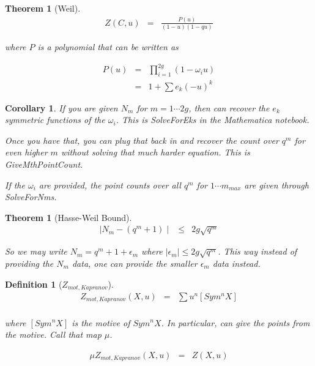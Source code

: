 \documentclass[11pt]{article}
\theoremstyle{change}
\newtheorem{definition}[equation]{Definition}
\newtheorem{thm}[equation]{Theorem}
\newtheorem{theorem}[equation]{Theorem}
\newtheorem{cor}[equation]{Corollary}
\theoremstyle{nonumberplain}
\numberwithin{equation}{section}
\newcommand\abs[1]{ \mid #1 \mid }
\begin{document}
\begin{thm}[Weil]
\begin{eqnarray*}
Z (C,u) &=& \frac{P(u)}{(1-u)(1-q u)}
\end{eqnarray*}

where $P$ is a polynomial that can be written as

\begin{eqnarray*}
P(u) &=& \prod_{i=1}^{2g} (1- \omega_i u)\\
&=& 1 + \sum e_k (-u)^k
\end{eqnarray*}

\end{thm}

\begin{cor}
If you are given $N_m$ for $m=1 \cdots 2g$, then can recover the $e_k$ symmetric functions of the $\omega_i$. This is SolveForEks in the Mathematica notebook.

Once you have that, you can plug that back in and recover the count over $q^m$ for even higher $m$ without solving that much harder equation. This is GiveMthPointCount.

If the $\omega_i$ are provided, the point counts over all $q^m$ for $1 \cdots m_{max}$ are given through SolveForNms.
\end{cor}

\begin{theorem}[Hasse-Weil Bound]
\begin{eqnarray*}
\abs{N_{m} - (q^m + 1)} &\leq& 2 g \sqrt{q^m}
\end{eqnarray*}

So we may write $N_m = q^m + 1 + \epsilon_m$ where $\abs{\epsilon_m} \leq 2 g \sqrt{q^m}$. This way instead of providing the $N_m$ data, one can provide the smaller $\epsilon_m$ data instead.

\end{theorem}

\begin{definition}[$Z_{mot,Kapranov}$]
\begin{eqnarray*}
Z_{mot,Kapranov} (X,u) &=& \sum u^n [Sym^n X]\\
\end{eqnarray*}

where $[Sym^n X]$ is the motive of $Sym^n X$. In particular, can give the points from the motive. Call that map $\mu$.

\begin{eqnarray*}
\mu Z_{mot,Kapranov} (X,u) &=& Z(X,u)
\end{eqnarray*}

\end{definition}
\end{document}

